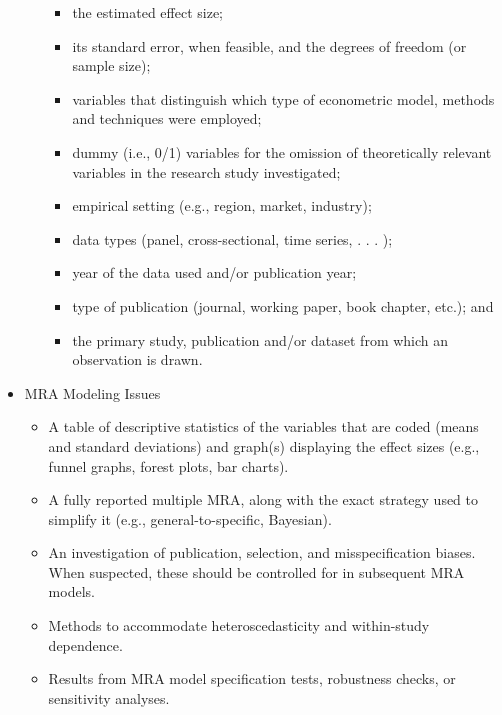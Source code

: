 \begin{frame}[allowframebreaks]
\begin{itemize}
\begin{itemize}
\begin{itemize}
    \item the estimated effect size;
    \item its standard error, when feasible, and the degrees of freedom (or sample size);
    \item variables that distinguish which type of econometric model, methods and techniques were employed;
    \item dummy (i.e., 0/1) variables for the omission of theoretically relevant
      variables in the research study investigated;
    \item empirical setting (e.g., region, market, industry);
    \item data types (panel, cross-sectional, time series, . . . );
    \item year of the data used and/or publication year;
    \item type of publication (journal, working paper, book chapter, etc.); and
    \item the primary study, publication and/or dataset from which an observation is drawn.
    \end{itemize}
  \end{itemize}
\item MRA Modeling Issues
  \begin{itemize}
  \item A table of descriptive statistics of the variables that are coded (means
    and standard deviations) and graph(s) displaying the effect sizes (e.g.,
    funnel graphs, forest plots, bar charts).
  \item A fully reported multiple MRA, along with the exact strategy used to
    simplify it (e.g., general-to-specific, Bayesian).
  \item An investigation of publication, selection, and misspecification biases.
    When suspected, these should be controlled for in subsequent MRA models.
  \item Methods to accommodate heteroscedasticity and within-study dependence.
  \item Results from MRA model specification tests, robustness checks, or sensitivity analyses.
  \end{itemize}

\end{itemize}


\end{frame}

